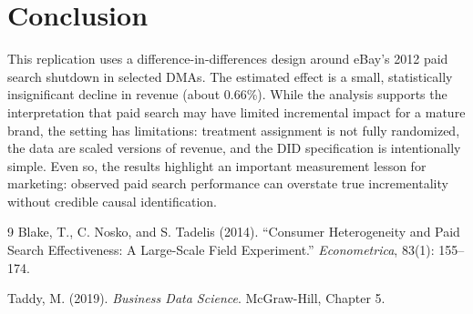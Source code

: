 \documentclass[12pt]{article}
\begin{document}
\section{Conclusion}
This replication uses a difference-in-differences design around eBay’s 2012 paid search shutdown in selected DMAs. The estimated effect is a small, statistically insignificant decline in revenue (about 0.66\%). While the analysis supports the interpretation that paid search may have limited incremental impact for a mature brand, the setting has limitations: treatment assignment is not fully randomized, the data are scaled versions of revenue, and the DID specification is intentionally simple. Even so, the results highlight an important measurement lesson for marketing: observed paid search performance can overstate true incrementality without credible causal identification.

\begin{thebibliography}{9}
Blake, T., C. Nosko, and S. Tadelis (2014).
``Consumer Heterogeneity and Paid Search Effectiveness: A Large-Scale Field Experiment.''
\textit{Econometrica}, 83(1): 155--174.

Taddy, M. (2019).
\textit{Business Data Science}. McGraw-Hill, Chapter 5.
\end{thebibliography}
\end{document}
